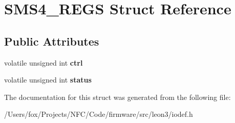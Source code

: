 \hypertarget{struct_s_m_s4___r_e_g_s}{
\section{SMS4\_\-REGS Struct Reference}
\label{struct_s_m_s4___r_e_g_s}
}
\subsection*{Public Attributes}
\begin{DoxyCompactItemize}
\item 
\hypertarget{struct_s_m_s4___r_e_g_s_a862115e558a2dfe24c0f6af22490e214}{
volatile unsigned int {\bfseries ctrl}}
\label{struct_s_m_s4___r_e_g_s_a862115e558a2dfe24c0f6af22490e214}

\item 
\hypertarget{struct_s_m_s4___r_e_g_s_acc6a60b55481fae9e3d029bf386d2d08}{
volatile unsigned int {\bfseries status}}
\label{struct_s_m_s4___r_e_g_s_acc6a60b55481fae9e3d029bf386d2d08}

\end{DoxyCompactItemize}


The documentation for this struct was generated from the following file:\begin{DoxyCompactItemize}
\item 
/Users/fox/Projects/NFC/Code/firmware/src/leon3/iodef.h\end{DoxyCompactItemize}
